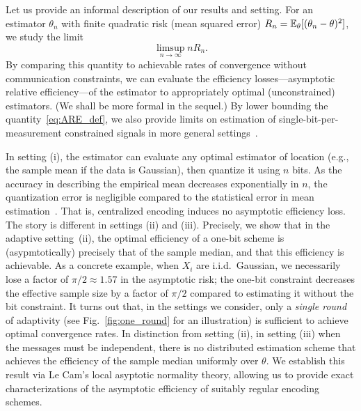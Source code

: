 Let us provide an informal description of our results and setting. For an
estimator $\theta_n$ with finite quadratic risk (mean squared error) $R_n =
\mathbb{E}_\theta[(\theta_n - \theta)^2]$, we study the limit
\begin{equation}
  \label{eq:ARE_def}
  \limsup_{n\to \infty} n R_n.
\end{equation}
By comparing this quantity to achievable rates of convergence without
communication constraints, we can evaluate the efficiency
losses---asymptotic relative efficiency---of the estimator to appropriately
optimal (unconstrained) estimators. (We shall be more formal in the sequel.)
By lower bounding the quantity~\eqref{eq:ARE_def}, we also provide limits on
estimation of single-bit-per-measurement constrained signals in more general
settings~\cite{baraniuk2017exponential, jacques2013robust, plan2013one,
  li2017channel, choi2016near}.


In setting (i), the estimator can evaluate any optimal estimator of location
(e.g., the sample mean if the data is Gaussian), then quantize it using
$n$ bits. As the accuracy in describing the empirical mean decreases
exponentially in $n$, the quantization error is negligible compared
to the statistical error in mean estimation~\cite{720540}. That is,
centralized encoding induces no asymptotic efficiency loss.
%
The story is different in settings (ii) and (iii). Precisely, we show that
in the adaptive setting~(ii), the optimal efficiency of a one-bit scheme is
(asypmtotically) precisely that of the sample median, and that this
efficiency is achievable. As a concrete example, when $X_i$ are
i.i.d.\ Gaussian, we necessarily lose a factor of $\pi/2 \approx 1.57$ in
the asymptotic risk; the one-bit constraint decreases the effective sample
size by a factor of $\pi/2$ compared to estimating it without the bit
constraint. It turns out that, in the settings we consider,
only a \emph{single round} of adaptivity (see Fig.~\ref{fig:one_round} for
an illustration) is sufficient to achieve optimal convergence rates.
%
In distinction from setting (ii), in setting (iii) when the messages must be
independent, there is no distributed estimation scheme that achieves the
efficiency of the sample median uniformly over $\theta$.  We establish this
result via Le Cam's local asyptotic normality theory, allowing us
to provide exact characterizations of the asymptotic efficiency
of suitably regular encoding schemes.

